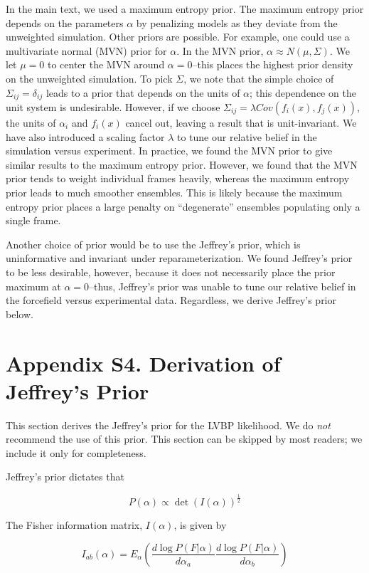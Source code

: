 \documentclass[journal=jacsat,manuscript=article]{achemso}
\begin{document}
In the main text, we used a maximum entropy prior.  The maximum entropy prior depends on the parameters $\alpha$ by penalizing models as they deviate from the unweighted simulation.  Other priors are possible.  For example, one could use a multivariate normal (MVN) prior for $\alpha$.  In the MVN prior, $\alpha \approx N(\mu,\Sigma)$.  We let $\mu = 0$ to center the MVN around $\alpha = 0$--this places the highest prior density on the unweighted simulation.  To pick $\Sigma$, we note that the simple choice of $\Sigma_{ij} = \delta_{ij}$ leads to a prior that depends on the units of $\alpha$; this dependence on the unit system is undesirable.  However, if we choose $\Sigma_{ij} = \lambda Cov(f_i(x), f_j(x))$, the units of $\alpha_i$ and $f_i(x)$ cancel out, leaving a result that is unit-invariant.  We have also introduced a scaling factor $\lambda$ to tune our relative belief in the simulation versus experiment.  In practice, we found the MVN prior to give similar results to the maximum entropy prior.  
However, we found that the MVN prior tends to weight individual frames heavily, whereas the maximum entropy prior leads to much smoother ensembles.  This is likely because the maximum entropy prior places a large penalty on ``degenerate'' ensembles populating only a single frame.  

Another choice of prior would be to use the Jeffrey's prior, which is uninformative and invariant under reparameterization.  We found Jeffrey's prior to be less desirable, however, because it does not necessarily place the prior maximum at $\alpha = 0$--thus, Jeffrey's prior was unable to tune our relative belief in the forcefield versus experimental data.  Regardless, we derive Jeffrey's prior below.


\section{Appendix S4.  Derivation of Jeffrey's Prior}

This section derives the Jeffrey's prior for the LVBP likelihood.  We do \emph{not} recommend the use of this prior.  This section can be skipped by most readers; we include it only for completeness.

Jeffrey's prior dictates that 

$$P(\alpha) \propto \det(I(\alpha))^\frac{1}{2}$$

The Fisher information matrix, $I(\alpha)$, is given by

$$I_{ab}(\alpha) = E_\alpha(\frac{d\log P(F|\alpha)}{d\alpha_{a}}\frac{d\log P(F|\alpha)}{d\alpha_{b}})$$
\end{document}
